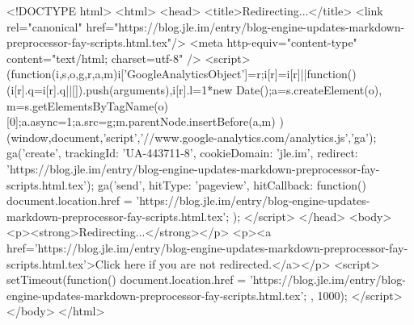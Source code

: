 <!DOCTYPE html>
<html>
<head>
<title>Redirecting...</title>
<link rel="canonical" href="https://blog.jle.im/entry/blog-engine-updates-markdown-preprocessor-fay-scripts.html.tex"/>
<meta http-equiv="content-type" content="text/html; charset=utf-8" />
<script>
(function(i,s,o,g,r,a,m){i['GoogleAnalyticsObject']=r;i[r]=i[r]||function(){
(i[r].q=i[r].q||[]).push(arguments)},i[r].l=1*new Date();a=s.createElement(o),
m=s.getElementsByTagName(o)[0];a.async=1;a.src=g;m.parentNode.insertBefore(a,m)
})(window,document,'script','//www.google-analytics.com/analytics.js','ga');
ga('create', { trackingId: 'UA-443711-8', cookieDomain: 'jle.im', redirect: 'https://blog.jle.im/entry/blog-engine-updates-markdown-preprocessor-fay-scripts.html.tex'});
ga('send', { hitType: 'pageview', hitCallback: function() { document.location.href = 'https://blog.jle.im/entry/blog-engine-updates-markdown-preprocessor-fay-scripts.html.tex'; } });
</script>
</head>
<body>
  <p><strong>Redirecting...</strong></p>
  <p><a href='https://blog.jle.im/entry/blog-engine-updates-markdown-preprocessor-fay-scripts.html.tex'>Click here if you are not redirected.</a></p>
  <script>
    setTimeout(function() { document.location.href = 'https://blog.jle.im/entry/blog-engine-updates-markdown-preprocessor-fay-scripts.html.tex'; }, 1000);
  </script>
</body>
</html>
